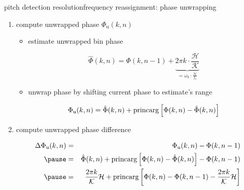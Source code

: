         \begin{frame}{pitch detection resolution}{frequency reassignment: phase unwrapping}
						\vspace{-3mm}
            \begin{enumerate}
                \item	compute unwrapped phase $\Phi_{\mathrm{u}}(k,n)$ 
                        \begin{itemize}
                            \item	estimate unwrapped bin phase
                                    \begin{footnotesize}
                                    \begin{equation*}\label{eq:phi_est}
                                        \hat{\Phi}(k,n) = \Phi(k,n-1) + \underbrace{2\pi k\cdot\frac{\mathcal{H}}{\mathcal{K}}}_{=\omega_k\cdot\frac{\mathcal{H}}{f_\mathrm{s}}} 
                                    \end{equation*}
                                    \end{footnotesize}

                            \item<2->	unwrap phase by shifting current phase to estimate's range
                                    \begin{footnotesize}
                                    \begin{equation*}
                                        \Phi_{\mathrm{u}}(k,n) = \hat{\Phi}(k,n) + \operatorname*{princarg}\left[ \Phi(k,n) - \hat{\Phi}(k,n) \right]
                                    \end{equation*}
                                    \end{footnotesize}
                        \end{itemize}

                \item<3->	compute unwrapped phase difference
                        \begin{footnotesize}
                        \begin{eqnarray*}
                            \Delta\Phi_{\mathrm{u}}(k,n)	&=& \Phi_{\mathrm{u}}(k,n) - \Phi(k,n-1)\nonumber\\
                                                \pause
                                                &=& \hat{\Phi}(k,n) + \princarg\left[ \Phi(k,n) - \hat{\Phi}(k,n) \right] - \Phi(k,n-1)\nonumber \\
                                                \pause
                                                &=& \frac{2\pi k}{\mathcal{K}}\mathcal{H} + \princarg\left[ \Phi(k,n) - \Phi(k,n-1) - \frac{2\pi k}{\mathcal{K}}\mathcal{H} \right]\nonumber
                        \end{eqnarray*}
                        \end{footnotesize}
            \end{enumerate}
        
        \end{frame}
